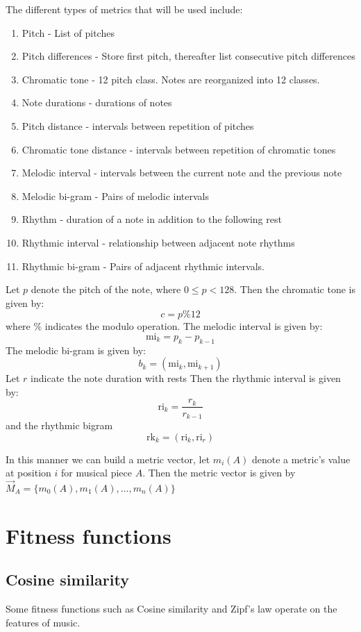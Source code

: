 The different types of metrics that will be used include:
\begin{enumerate}
\item Pitch - List of pitches
\item Pitch differences - Store first pitch, thereafter list consecutive pitch differences
\item Chromatic tone - 12 pitch class. Notes are reorganized into 12 classes.
\item Note durations - durations of notes
\item Pitch distance - intervals between repetition of pitches
\item Chromatic tone distance - intervals between repetition of chromatic tones  
\item Melodic interval - intervals between the current note and the previous note
\item Melodic bi-gram - Pairs of melodic intervals
\item Rhythm - duration of a note in addition to the following rest
\item Rhythmic interval - relationship between adjacent note rhythms
\item Rhythmic bi-gram - Pairs of adjacent rhythmic intervals.
\end{enumerate}

Let $p$ denote the pitch of the note, where $0 \leq p < 128$.
Then the chromatic tone is given by:
\[c = p \% 12\]
where $\%$ indicates the modulo operation.
The melodic interval is given by:
\[\text{mi}_k = p_k - p_{k-1} \]
The melodic bi-gram is given by:
\[b_k = (\text{mi}_k, \text{mi}_{k+1}) \]
Let $r$ indicate the note duration with rests
Then the rhythmic interval is given by:
\[\text{ri}_k = \frac{r_k}{r_{k-1}} \]
and the rhythmic bigram
\[\text{rk}_k = (\text{ri}_k, \text{ri}_r) \]

In this manner we can build a metric vector, let $m_i(A)$ denote a metric's value at position $i$ for musical piece $A$. Then the metric vector is given by $\vec{M}_A = \{m_0(A), m_1(A), \ldots, m_n(A) \}$ 



\chapter{Fitness functions}
\section{Cosine similarity}
Some fitness functions such as Cosine similarity and Zipf's law operate on the features of music. 

